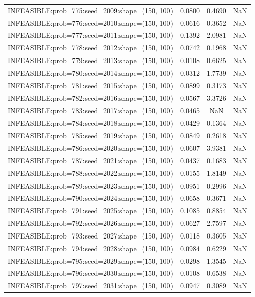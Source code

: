 \begin{longtable}{lccc}
INFEASIBLE:prob=775:seed=2009:shape=(150, 100) & 0.0800 &  0.4690 &    NaN \\
INFEASIBLE:prob=776:seed=2010:shape=(150, 100) & 0.0616 &  0.3652 &    NaN \\
INFEASIBLE:prob=777:seed=2011:shape=(150, 100) & 0.1392 &  2.0981 &    NaN \\
INFEASIBLE:prob=778:seed=2012:shape=(150, 100) & 0.0742 &  0.1968 &    NaN \\
INFEASIBLE:prob=779:seed=2013:shape=(150, 100) & 0.0108 &  0.6625 &    NaN \\
INFEASIBLE:prob=780:seed=2014:shape=(150, 100) & 0.0312 &  1.7739 &    NaN \\
INFEASIBLE:prob=781:seed=2015:shape=(150, 100) & 0.0899 &  0.3173 &    NaN \\
INFEASIBLE:prob=782:seed=2016:shape=(150, 100) & 0.0567 &  3.3726 &    NaN \\
INFEASIBLE:prob=783:seed=2017:shape=(150, 100) & 0.0465 &     NaN &    NaN \\
INFEASIBLE:prob=784:seed=2018:shape=(150, 100) & 0.0429 &  0.1364 &    NaN \\
INFEASIBLE:prob=785:seed=2019:shape=(150, 100) & 0.0849 &  0.2618 &    NaN \\
INFEASIBLE:prob=786:seed=2020:shape=(150, 100) & 0.0607 &  3.9381 &    NaN \\
INFEASIBLE:prob=787:seed=2021:shape=(150, 100) & 0.0437 &  0.1683 &    NaN \\
INFEASIBLE:prob=788:seed=2022:shape=(150, 100) & 0.0155 &  1.8149 &    NaN \\
INFEASIBLE:prob=789:seed=2023:shape=(150, 100) & 0.0951 &  0.2996 &    NaN \\
INFEASIBLE:prob=790:seed=2024:shape=(150, 100) & 0.0658 &  0.3671 &    NaN \\
INFEASIBLE:prob=791:seed=2025:shape=(150, 100) & 0.1085 &  0.8854 &    NaN \\
INFEASIBLE:prob=792:seed=2026:shape=(150, 100) & 0.0627 &  2.7597 &    NaN \\
INFEASIBLE:prob=793:seed=2027:shape=(150, 100) & 0.0118 &  0.3605 &    NaN \\
INFEASIBLE:prob=794:seed=2028:shape=(150, 100) & 0.0984 &  0.6229 &    NaN \\
INFEASIBLE:prob=795:seed=2029:shape=(150, 100) & 0.0298 &  1.3545 &    NaN \\
INFEASIBLE:prob=796:seed=2030:shape=(150, 100) & 0.0108 &  0.6538 &    NaN \\
INFEASIBLE:prob=797:seed=2031:shape=(150, 100) & 0.0947 &  0.3089 &    NaN \\

\end{longtable}
